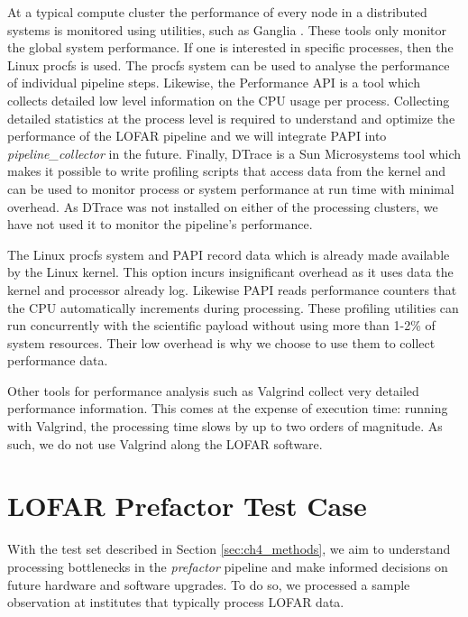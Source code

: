 At a typical compute cluster the performance of every node in a distributed systems is monitored using utilities, such as Ganglia \citep{ganglia}. These tools only monitor the global system performance. 
If one is interested in specific processes, then the Linux procfs \citep{procfs} is used. The procfs system can be used to analyse the performance of individual pipeline steps. Likewise, the Performance API \citep[PAPI,][]{papi} is a tool which collects detailed low level information on the CPU usage per process. Collecting detailed statistics at the process level is required to understand and optimize the performance of the LOFAR pipeline and we will integrate PAPI into \textit{pipeline\_collector} in the future. Finally, DTrace\citep{dtrace} is a Sun Microsystems tool which makes it possible to write profiling scripts that access data from the kernel and can be used to monitor process or system performance at run time with minimal overhead. As DTrace was not installed on either of the processing clusters, we have not used it to monitor the pipeline's performance. 

The Linux procfs system and PAPI record data which is already made available by the Linux kernel. This option incurs insignificant overhead as it uses data the kernel and processor already log. Likewise PAPI reads performance counters that the CPU automatically increments during processing. These profiling utilities can run concurrently with the scientific payload without using more than 1-2\% of system resources. Their low overhead is why we choose to use them to collect performance data. 

Other tools for performance analysis such as Valgrind \citep{valgrind} collect very detailed performance information. This comes at the expense of execution time: running with Valgrind, the processing time slows by up to two orders of magnitude. As such, we do not use Valgrind along the LOFAR software. 



\section{LOFAR Prefactor Test Case}\label{sec:ch4_results}
  
With the test set described in Section \ref{sec:ch4_methods}, we aim to understand processing bottlenecks in the \textit{prefactor} pipeline and make informed decisions on future hardware and software upgrades. To do so, we processed a sample observation at institutes that typically process LOFAR data. 

